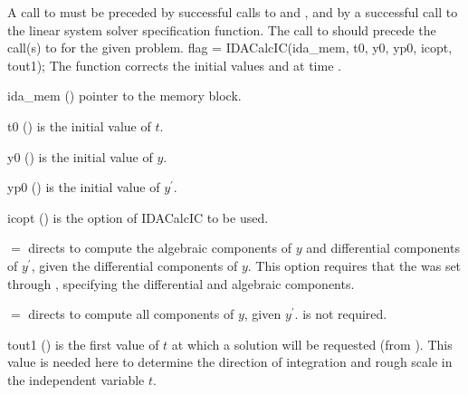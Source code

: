 A call to  must be preceded by successful calls to  
 and , and by a successful call to the 
linear system solver specification function.  
The call to  should precede the call(s) to   
for the given problem.
%
{
  flag = IDACalcIC(ida\_mem, t0, y0, yp0, icopt, tout1);
}
{
  The function  corrects the initial values  and  at time .
}
{
  \begin{args}

  \item[ida\_mem] ()
    pointer to the {\ida} memory block.

  \item[t0] ()
    is the initial value of $t$.

  \item[y0] ()
    is the initial value of $y$. 

  \item[yp0] ()
    is the initial value of $y^\prime$.   

  \item[icopt] ()
    is the option of IDACalcIC to be used.
    
    $=$ directs  to compute 
    the algebraic components of $y$ and differential components of $y^\prime$, 
    given the differential components of $y$.  
    This option requires that the   was set through 
    , specifying the differential and algebraic components.  
    
    $=$ directs  to compute all  
    components of $y$, given $y^\prime$.   is not required.

  \item[tout1] ()
    is the first value of $t$ at which a solution will be requested (from ).
    This value 
    is needed here to determine the direction of integration and rough scale  
    in the independent variable $t$.   

  \end{args}
}
